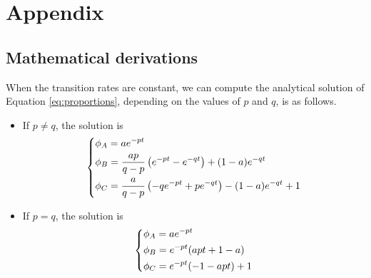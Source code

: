 \chapter*{Appendix}\label{ch:appendix}
\renewcommand{\thesection}{A.\arabic{section}}


\section{Mathematical derivations}\label{sec:derivations}


\begin{proposition*}
    When the transition rates are constant, we can compute the analytical solution of Equation \ref{eq:proportions}, depending on the values of $p$ and $q$, is as follows.
    \begin{itemize}
        \item If $p\neq q$, the solution is
            \begin{align*}
                \begin{dcases}
                    \phi_A = ae^{-pt}\\
                    \phi_B = \frac{ap}{q-p}\left(e^{-pt}-e^{-qt}\right)+(1-a)e^{-qt}\\
                    \phi_C = \frac{a}{q-p}\left(-qe^{-pt}+pe^{-qt}\right) - (1-a)e^{-qt} + 1
                \end{dcases}
            \end{align*}

        \item If $p=q$, the solution is
            \begin{align*}
                \begin{dcases}
                    \phi_A = ae^{-pt}\\
                    \phi_B = e^{-pt}(apt + 1 - a)\\
                    \phi_C = e^{-pt}(-1-apt) + 1
                \end{dcases}
            \end{align*}
    \end{itemize}
\end{proposition*}


